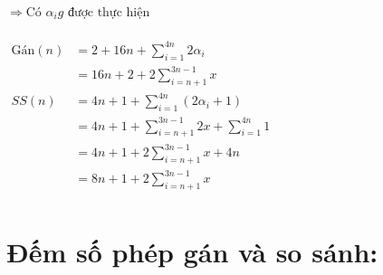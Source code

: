 \documentclass[12pt, letterpaper]{article}
\begin{document}
	$\Rightarrow \text{Có } \alpha_i g \text{ được thực hiện }$  \\
	 \\
	$ \begin{aligned}
		\text{Gán}(n) & = 2 + 16n + \sum^{4n}_{i = 1} 2 \alpha_i \\
			& = 16n + 2 + 2 \sum^{3n-1}_{i = n + 1} x\\
		SS(n) & = 4n + 1 + \sum^{4n}_{i = 1} (2 \alpha_i + 1) \\
			& = 4n + 1 + \sum^{3n-1}_{i = n + 1} 2x + \sum^{4n}_{i = 1} 1 \\
			& = 4n + 1 + 2\sum^{3n-1}_{i = n + 1} x + 4n \\
			& = 8n + 1 + 2\sum^{3n-1}_{i = n + 1} x \\
	\end{aligned} $ \\
\section{Đếm số phép gán và so sánh:}
\end{document}
